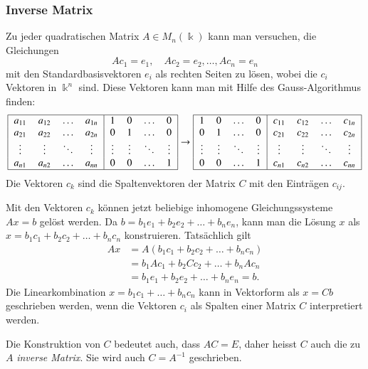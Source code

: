 \subsubsection{Inverse Matrix}
Zu jeder quadratischen Matrix $A\in M_n(\Bbbk)$ kann man versuchen, die
Gleichungen
\[
Ac_1 = e_1,\quad Ac_2 = e_2, \dots, Ac_n = e_n
\]
mit den Standardbasisvektoren $e_i$ als rechten Seiten zu lösen, wobei
die $c_i$ Vektoren in $\Bbbk^n$ sind.
Diese Vektoren kann man mit Hilfe des Gauss-Algorithmus finden:
\[
\begin{tabular}{|>{$}c<{$}>{$}c<{$}>{$}c<{$}>{$}c<{$}|>{$}c<{$}>{$}c<{$}>{$}c<{$}>{$}c<{$}|}
\hline
a_{11}&a_{12}&\dots &a_{1n}&1     &0     &\dots &0     \\
a_{21}&a_{22}&\dots &a_{2n}&0     &1     &\dots &0     \\
\vdots&\vdots&\ddots&\vdots&\vdots&\vdots&\ddots&\vdots\\
a_{n1}&a_{n2}&\dots &a_{nn}&0     &0     &\dots &1     \\
\hline
\end{tabular}
\rightarrow
\begin{tabular}{|>{$}c<{$}>{$}c<{$}>{$}c<{$}>{$}c<{$}|>{$}c<{$}>{$}c<{$}>{$}c<{$}>{$}c<{$}|}
\hline
1     &0     &\dots &0     &c_{11}&c_{12}&\dots &c_{1n}\\
0     &1     &\dots &0     &c_{21}&c_{22}&\dots &c_{2n}\\
\vdots&\vdots&\ddots&\vdots&\vdots&\vdots&\ddots&\vdots\\
0     &0     &\dots &1     &c_{n1}&c_{n2}&\dots &c_{nn}\\
\hline
\end{tabular}
\]
Die Vektoren $c_k$ sind die Spaltenvektoren der Matrix $C$ mit den
Einträgen $c_{ij}$.

Mit den Vektoren $c_k$ können jetzt beliebige inhomogene Gleichungssysteme
$Ax=b$ gelöst werden.
Da $b = b_1e_1 + b_2e_2 + \dots + b_ne_n$, kann man die Lösung $x$ als
$x = b_1c_1+b_2c_2+\dots+b_nc_n$ konstruieren.
Tatsächlich gilt
\begin{align*}
Ax
&=
A( b_1c_1+b_2c_2+\dots+b_nc_n)
\\
&=
b_1Ac_1 + b_2Cc_2 + \dots + b_nAc_n
\\
&=
b_1e_1 + b_2e_2 + \dots + b_ne_n
=
b.
\end{align*}
Die Linearkombination $x=b_1c_1+\dots+b_nc_n$ kann in Vektorform als $x=Cb$
geschrieben werden, wenn die Vektoren $c_i$ als Spalten einer Matrix $C$ 
interpretiert werden.

Die Konstruktion von $C$ bedeutet auch, dass $AC=E$, daher heisst $C$ auch
die zu $A$ {\em inverse Matrix}.
Sie wird auch $C=A^{-1}$ geschrieben.

